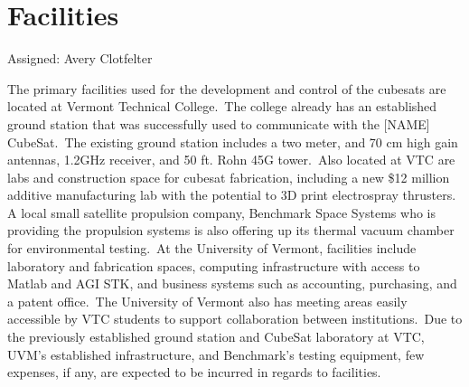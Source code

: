 \section{Facilities}
Assigned: Avery Clotfelter

The primary facilities used for the development and control of the
cubesats are located at Vermont Technical College. The college
already has an established ground station that was successfully used
to communicate with the [NAME] CubeSat. The existing ground station
includes a two meter, and 70 cm high gain antennas, 1.2GHz receiver,
and 50 ft. Rohn 45G tower. Also located at VTC are labs and
construction space for cubesat fabrication, including a new \$12
million additive manufacturing lab with the potential to 3D print
electrospray thrusters. A local small satellite propulsion company,
Benchmark Space Systems who is providing the propulsion systems is
also offering up its thermal vacuum chamber for environmental
testing. At the University of Vermont, facilities include laboratory
and fabrication spaces, computing infrastructure with access to Matlab
and AGI STK, and business systems such as accounting, purchasing, and
a patent office. The University of Vermont also has meeting areas
easily accessible by VTC students to support collaboration between
institutions. Due to the previously established ground station and
CubeSat laboratory at VTC, UVM’s established infrastructure, and
Benchmark’s testing equipment, few expenses, if any, are expected to
be incurred in regards to facilities.
